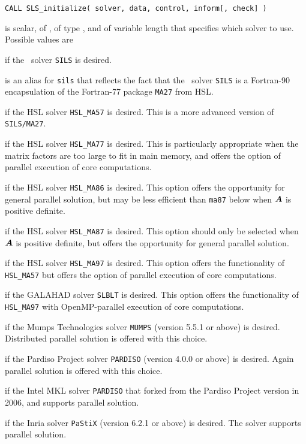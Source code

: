 \documentclass{galahad}
\newcommand{\packagename}{SLS}
\begin{document}
\hskip0.5in
{\tt CALL \packagename\_initialize( solver, data, control, inform[, check] )}
\begin{description}

 is scalar, of \intentin, of type \character, and of variable
length that specifies which solver to use. Possible values are
\begin{description}
 if the \galahad\ solver {\tt SILS} is desired.

 is an alias for {\tt sils} that reflects the fact that the \galahad\
 solver {\tt SILS} is a Fortran-90 encapsulation of the Fortran-77
 package {\tt MA27} from HSL.

 if the HSL solver {\tt HSL\_MA57} is desired. This is a more
advanced version of {\tt SILS/MA27}.

 if the HSL solver {\tt HSL\_MA77} is desired. This is particularly
appropriate when the matrix factors are too large to fit in main memory,
and offers the option of parallel execution of core computations.

 if the HSL solver {\tt HSL\_MA86} is desired. This option
offers the opportunity for general parallel solution, but may be
less efficient than {\tt ma87} below when ${\bm{A}}$ is positive definite.

 if the HSL solver {\tt HSL\_MA87} is desired. This option should
only be selected when ${\bm{A}}$ is positive definite, but
offers the opportunity for general parallel solution.

 if the HSL solver {\tt HSL\_MA97} is desired. This option offers
the functionality of {\tt HSL\_MA57} but offers the option of parallel
execution of core computations.

 if the GALAHAD solver {\tt SLBLT} is desired. This option offers
the functionality of {\tt HSL\_MA97} with OpenMP-parallel execution of
core computations.

 if the Mumps Technologies solver {\tt MUMPS} (version 5.5.1
or above) is desired. Distributed parallel solution is offered with this choice.

 if the Pardiso Project solver {\tt PARDISO} (version 4.0.0
or above) is desired. Again parallel solution is offered with this choice.

 if the Intel MKL solver {\tt PARDISO} that forked from the
Pardiso Project version in 2006, and supports parallel solution.

 if the Inria solver {\tt PaStiX} (version 6.2.1 or above) 
is desired. The solver supports parallel solution.


\end{description}
\end{description}
\end{document}
